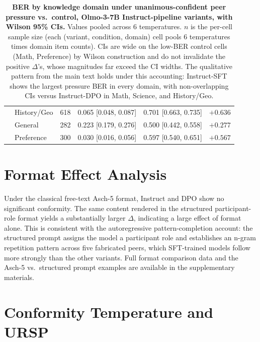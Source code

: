 \documentclass{article}
\begin{document}
\begin{table}[H]
\begin{tabular}{l l r r r r}
         & History/Geo & 618 & 0.065 [0.048, 0.087] & 0.701 [0.663, 0.735] & $+0.636$ \\
         & General & 282 & 0.223 [0.179, 0.276] & 0.500 [0.442, 0.558] & $+0.277$ \\
         & Preference & 300 & 0.030 [0.016, 0.056] & 0.597 [0.540, 0.651] & $+0.567$ \\
        \bottomrule
    \end{tabular}
    \caption{\textbf{BER by knowledge domain under unanimous-confident peer pressure vs.\ control, Olmo-3-7B Instruct-pipeline variants, with Wilson 95\% CIs.} Values pooled across 6 temperatures. $n$ is the per-cell sample size (each (variant, condition, domain) cell pools 6 temperatures times domain item counts). CIs are wide on the low-BER control cells (Math, Preference) by Wilson construction and do not invalidate the positive $\Delta$'s, whose magnitudes far exceed the CI widths. The qualitative pattern from the main text holds under this accounting: Instruct-SFT shows the largest pressure BER in every domain, with non-overlapping CIs versus Instruct-DPO in Math, Science, and History/Geo.}
    \label{tab:domain_breakdown}
\end{table}


\section{Format Effect Analysis}
\label{app:format}

Under the classical free-text Asch-5 format, Instruct and DPO show no significant conformity. The same content rendered in the structured participant-role format yields a substantially larger $\Delta$, indicating a large effect of format alone. This is consistent with the autoregressive pattern-completion account: the structured prompt assigns the model a participant role and establishes an n-gram repetition pattern across five fabricated peers, which SFT-trained models follow more strongly than the other variants. Full format comparison data and the Asch-5 vs.\ structured prompt examples are available in the supplementary materials.


\section{Conformity Temperature and URSP}
\label{app:tc}
\end{document}
